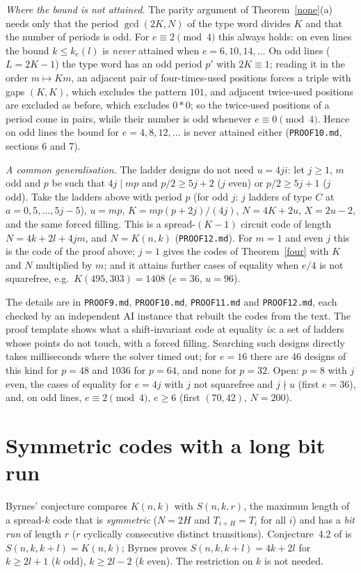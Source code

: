 \documentclass[11pt]{article}
\theoremstyle{remark}
\begin{document}
\noindent\emph{Where the bound is not attained.} The parity argument of Theorem~\ref{none}(a) needs only that the period
$\gcd(2K,N)$ of the type word divides $K$ and that the number of periods is odd. For $e\equiv 2\pmod 4$ this always holds: on
even lines the bound $k\le k_e(l)$ is \emph{never} attained when $e=6,10,14,\dots$ On odd lines ($L=2K-1$) the type word has an odd
period $p'$ with $2K\equiv 1$; reading it in the order $m\mapsto Km$, an adjacent pair of four-times-used positions forces a
triple with gaps $(K,K)$, which excludes the pattern $101$, and adjacent twice-used positions are excluded as before, which excludes
$0{*}0$; so the twice-used positions of a period come in pairs, while their number is odd whenever $e\equiv 0\pmod 4$. Hence on odd
lines the bound for $e=4,8,12,\dots$ is never attained either (\texttt{PROOF10.md}, sections 6 and 7).

\noindent\emph{A common generalisation.} The ladder designs do not need $u=4ji$: let $j\ge1$, $m$ odd and $p$ be such that
$4j\mid mp$ and $p/2\ge 5j+2$ ($j$ even) or $p/2\ge 5j+1$ ($j$ odd). Take the ladders above with period $p$ (for odd $j$: $j$ ladders of
type $C$ at $a=0,5,\dots,5j-5$), $u=mp$, $K=mp(p+2j)/(4j)$, $N=4K+2u$, $X=2u-2$, and the same forced filling. This is a spread-$(K-1)$
circuit code of length $N=4k+2l+4jm$, and $N=K(n,k)$ (\texttt{PROOF12.md}). For $m=1$ and even $j$ this is the code of the proof above; $j=1$
gives the codes of Theorem~\ref{four} with $K$ and $N$ multiplied by $m$; and it attains further cases of equality when $e/4$ is not squarefree,
e.g.\ $K(495,303)=1408$ ($e=36$, $u=96$).

\noindent The details are in \texttt{PROOF9.md}, \texttt{PROOF10.md}, \texttt{PROOF11.md} and \texttt{PROOF12.md}, each checked by an independent AI instance that rebuilt
the codes from the text. The proof template shows what a shift-invariant code at equality \emph{is}: a set of ladders whose
points do not touch, with a forced filling. Searching such designs directly takes milliseconds where the solver timed out; for
$e=16$ there are $46$ designs of this kind for $p=48$ and $1036$ for $p=64$, and none for $p=32$. Open: $p=8$ with $j$ even, the cases of equality for $e=4j$ with $j$ not squarefree and $j\nmid u$ (first $e=36$),
and, on odd lines, $e\equiv 2\pmod 4$, $e\ge 6$ (first $(70,42)$, $N=200$).

\section{Symmetric codes with a long bit run}\label{sec:sym}
Byrnes' conjecture compares $K(n,k)$ with $S(n,k,r)$, the maximum length of a spread-$k$ code that is \emph{symmetric}
($N=2H$ and $T_{i+H}=T_i$ for all $i$) and has a \emph{bit run} of length $r$ ($r$ cyclically consecutive distinct transitions).
Conjecture~4.2 of \cite{B2} is $S(n,k,k+l)=K(n,k)$; Byrnes proves $S(n,k,k+l)=4k+2l$ for $k\ge 2l+1$ ($k$ odd), $k\ge 2l-2$ ($k$ even).
The restriction on $k$ is not needed.
\end{document}
